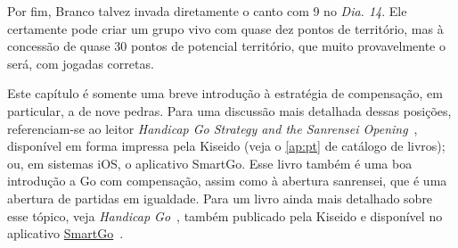 Por fim, Branco talvez invada diretamente o canto com 9 no \emph{Dia. 14}. Ele certamente pode criar um grupo vivo com quase dez pontos de território, mas à concessão de quase 30 pontos de potencial território, que muito provavelmente o será, com jogadas corretas.

\bigskip

Este capítulo é somente uma breve introdução à estratégia de compensação, em particular, a de nove pedras. Para uma discussão mais detalhada dessas posições, referenciam-se ao leitor \emph{Handicap Go Strategy and the Sanrensei Opening}~\cite{zeijst_bozulich_handicap_sanrensei}, disponível em forma impressa pela Kiseido (veja o \autoref{ap:pt} de catálogo de livros); ou, em sistemas iOS, o aplicativo SmartGo. Esse livro também é uma boa introdução a Go com compensação, assim como à abertura sanrensei, que é uma abertura de partidas em igualdade. Para um livro ainda mais detalhado sobre esse tópico, veja \emph{Handicap Go}~\cite{nagahara_bozulich_handicap_go}, também publicado pela Kiseido e disponível no aplicativo \href{apps.apple.com/us/app/smartgo-player/id314506629}{SmartGo}~\cite{smartgo}.